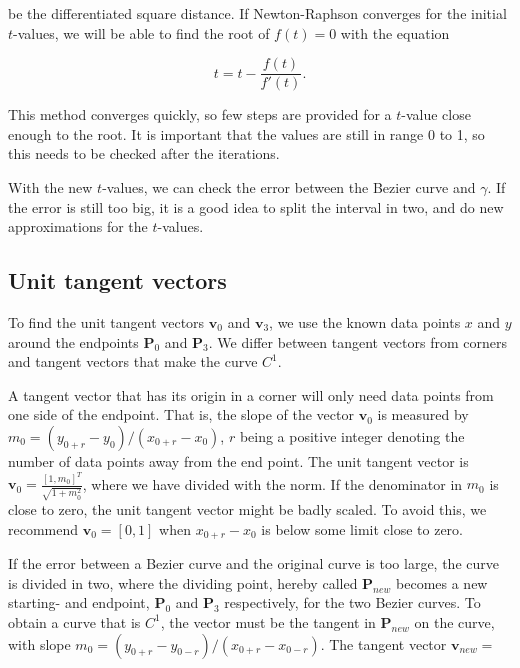 \documentclass[10pt]{article}
\begin{document}
be the differentiated square distance. If Newton-Raphson converges for the initial $t$-values, we will be able to find the root of $f(t) = 0$ with the equation

\begin{equation}
t = t - \frac{f(t)}{f'(t)}.
\end{equation}

This method converges quickly, so few steps are provided for a $t$-value close enough to the root. It is important that the values are still in range 0 to 1, so this needs to be checked after the iterations. 

With the new $t$-values, we can check the error between the Bezier curve and $\gamma$. If the error is still too big, it is a good idea to split the interval in two, and do new approximations for the $t$-values.

\subsection*{Unit tangent vectors}
To find the unit tangent vectors $\mathbf{v}_0$ and $\mathbf{v}_3$, we use the known data points $x$ and $y$ around the endpoints $\mathbf{P}_0$ and $\mathbf{P}_3$. We differ between tangent vectors from corners and tangent vectors that make the curve $C^1$.

A tangent vector that has its origin in a corner will only need data points from one side of the endpoint. That is, the slope of the vector $\mathbf{v}_0$ is measured by $m_0 = (y_{0+r} - y_0)/(x_{0+r} - x_0)$, $r$ being a positive integer denoting the number of data points away from the end point. The unit tangent vector is  $\mathbf{v}_0 = \frac{[1, m_0]^T}{\sqrt{1+m_0^2}}$, where we have divided with the norm. If the denominator in $m_0$ is close to zero, the unit tangent vector might be badly scaled. To avoid this, we recommend $\mathbf{v}_0 = [0,1]$ when $x_{0+r} - x_0$ is below some limit close to zero. 

If the error between a Bezier curve and the original curve is too large, the curve is divided in two, where the dividing point, hereby called $\mathbf{P}_{new}$ becomes a new starting- and endpoint, $\mathbf{P}_0$ and $\mathbf{P}_3$ respectively, for the two Bezier curves. To obtain a curve that is $C^1$, the vector must be the tangent in $\mathbf{P}_{new}$ on the curve, with slope $m_0 = (y_{0+r} - y_{0-r})/(x_{0+r} - x_{0-r})$. The tangent vector $\mathbf{v}_{new} = $
\end{document}
